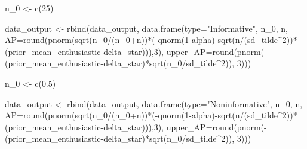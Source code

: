 \documentclass[
]{book}
\newenvironment{Shaded}{\begin{snugshade}}{\end{snugshade}}
\newcommand{\AttributeTok}[1]{\textcolor[rgb]{0.77,0.63,0.00}{#1}}
\newcommand{\DecValTok}[1]{\textcolor[rgb]{0.00,0.00,0.81}{#1}}
\newcommand{\FloatTok}[1]{\textcolor[rgb]{0.00,0.00,0.81}{#1}}
\newcommand{\FunctionTok}[1]{\textcolor[rgb]{0.00,0.00,0.00}{#1}}
\newcommand{\NormalTok}[1]{#1}
\newcommand{\OtherTok}[1]{\textcolor[rgb]{0.56,0.35,0.01}{#1}}
\newcommand{\SpecialCharTok}[1]{\textcolor[rgb]{0.00,0.00,0.00}{#1}}
\newcommand{\StringTok}[1]{\textcolor[rgb]{0.31,0.60,0.02}{#1}}
\begin{document}
\begin{Shaded}
\begin{Highlighting}[]
\NormalTok{n\_0 }\OtherTok{\textless{}{-}} \FunctionTok{c}\NormalTok{(}\DecValTok{25}\NormalTok{)}

\NormalTok{data\_output }\OtherTok{\textless{}{-}} \FunctionTok{rbind}\NormalTok{(data\_output, }\FunctionTok{data.frame}\NormalTok{(}\AttributeTok{type=}\StringTok{"Informative"}\NormalTok{, n\_0, n, }\AttributeTok{AP=}\FunctionTok{round}\NormalTok{(}\FunctionTok{pnorm}\NormalTok{(}\FunctionTok{sqrt}\NormalTok{(n\_0}\SpecialCharTok{/}\NormalTok{(n\_0}\SpecialCharTok{+}\NormalTok{n))}\SpecialCharTok{*}\NormalTok{(}\SpecialCharTok{{-}}\FunctionTok{qnorm}\NormalTok{(}\DecValTok{1}\SpecialCharTok{{-}}\NormalTok{alpha)}\SpecialCharTok{{-}}\FunctionTok{sqrt}\NormalTok{(n}\SpecialCharTok{/}\NormalTok{(sd\_tilde}\SpecialCharTok{\^{}}\DecValTok{2}\NormalTok{))}\SpecialCharTok{*}\NormalTok{(prior\_mean\_enthusiastic}\SpecialCharTok{{-}}\NormalTok{delta\_star))),}\DecValTok{3}\NormalTok{), }\AttributeTok{upper\_AP=}\FunctionTok{round}\NormalTok{(}\FunctionTok{pnorm}\NormalTok{(}\SpecialCharTok{{-}}\NormalTok{(prior\_mean\_enthusiastic}\SpecialCharTok{{-}}\NormalTok{delta\_star)}\SpecialCharTok{*}\FunctionTok{sqrt}\NormalTok{(n\_0}\SpecialCharTok{/}\NormalTok{sd\_tilde}\SpecialCharTok{\^{}}\DecValTok{2}\NormalTok{)), }\DecValTok{3}\NormalTok{)))}

\NormalTok{n\_0 }\OtherTok{\textless{}{-}} \FunctionTok{c}\NormalTok{(}\FloatTok{0.5}\NormalTok{)}

\NormalTok{data\_output }\OtherTok{\textless{}{-}} \FunctionTok{rbind}\NormalTok{(data\_output, }\FunctionTok{data.frame}\NormalTok{(}\AttributeTok{type=}\StringTok{"Noninformative"}\NormalTok{, n\_0, n, }\AttributeTok{AP=}\FunctionTok{round}\NormalTok{(}\FunctionTok{pnorm}\NormalTok{(}\FunctionTok{sqrt}\NormalTok{(n\_0}\SpecialCharTok{/}\NormalTok{(n\_0}\SpecialCharTok{+}\NormalTok{n))}\SpecialCharTok{*}\NormalTok{(}\SpecialCharTok{{-}}\FunctionTok{qnorm}\NormalTok{(}\DecValTok{1}\SpecialCharTok{{-}}\NormalTok{alpha)}\SpecialCharTok{{-}}\FunctionTok{sqrt}\NormalTok{(n}\SpecialCharTok{/}\NormalTok{(sd\_tilde}\SpecialCharTok{\^{}}\DecValTok{2}\NormalTok{))}\SpecialCharTok{*}\NormalTok{(prior\_mean\_enthusiastic}\SpecialCharTok{{-}}\NormalTok{delta\_star))),}\DecValTok{3}\NormalTok{), }\AttributeTok{upper\_AP=}\FunctionTok{round}\NormalTok{(}\FunctionTok{pnorm}\NormalTok{(}\SpecialCharTok{{-}}\NormalTok{(prior\_mean\_enthusiastic}\SpecialCharTok{{-}}\NormalTok{delta\_star)}\SpecialCharTok{*}\FunctionTok{sqrt}\NormalTok{(n\_0}\SpecialCharTok{/}\NormalTok{sd\_tilde}\SpecialCharTok{\^{}}\DecValTok{2}\NormalTok{)), }\DecValTok{3}\NormalTok{)))}


\end{Highlighting}
\end{Shaded}
\end{document}

